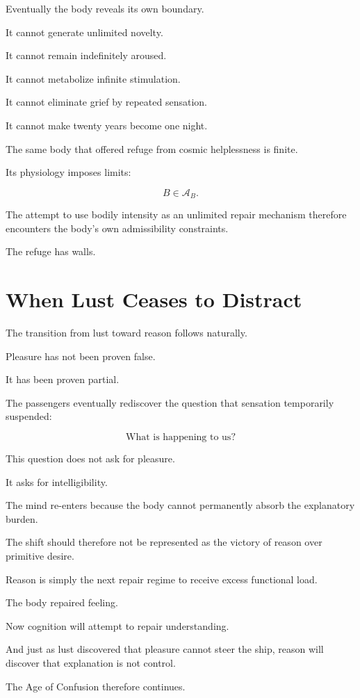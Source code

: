 \documentclass[11pt,oneside]{book}
\theoremstyle{definition}
\theoremstyle{remark}
\newcommand{\A}{\mathcal{A}}
\begin{document}
Eventually the body reveals its own boundary.

It cannot generate unlimited novelty.

It cannot remain indefinitely aroused.

It cannot metabolize infinite stimulation.

It cannot eliminate grief by repeated sensation.

It cannot make twenty years become one night.

The same body that offered refuge from cosmic helplessness is finite.

Its physiology imposes limits:

\[
B\in\A_B.
\]

The attempt to use bodily intensity as an unlimited repair mechanism therefore encounters the body's own admissibility constraints.

The refuge has walls.

\section{When Lust Ceases to Distract}

The transition from lust toward reason follows naturally.

Pleasure has not been proven false.

It has been proven partial.

The passengers eventually rediscover the question that sensation temporarily suspended:

\[
\text{What is happening to us?}
\]

This question does not ask for pleasure.

It asks for intelligibility.

The mind re-enters because the body cannot permanently absorb the explanatory burden.

The shift should therefore not be represented as the victory of reason over primitive desire.

Reason is simply the next repair regime to receive excess functional load.

The body repaired feeling.

Now cognition will attempt to repair understanding.

And just as lust discovered that pleasure cannot steer the ship, reason will discover that explanation is not control.

The Age of Confusion therefore continues.
\end{document}
